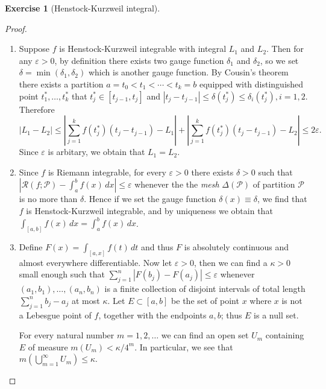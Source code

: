 \documentclass[a4paper]{article}
\newtheorem{ex}{Exercise}[subsection]
\begin{document}
\begin{ex}[Henstock-Kurzweil integral]\end{ex}\begin{proof}\ \begin{enumerate}[label = (\roman*)]
    \item Suppose $f$ is Henstock-Kurzweil integrable with integral $L_1$ and $L_2$. Then for any $\varepsilon > 0$,
    by definition there exists two gauge function $\delta_1$ and $\delta_2$, so we set $\delta = \min(\delta_1, \delta_2)$
    which is another gauge function. By Cousin's theorem there exists a partition $a = t_0 < t_1 < \cdots < t_k = b$
    equipped with distinguished point $t_1^*, \dots, t_k^*$ that $t_j^* \in [t_{j - 1}, t_j]$ and 
    $|t_j - t_{j - 1}| \leq \delta(t_j^*) \leq \delta_i(t_j^*), i = 1,2$. Therefore  $$
    |L_1 - L_2| \leq |\sum_{j = 1}^k f(t_j^*)(t_j - t_{j - 1}) - L_1| + |\sum_{j = 1}^k f(t_j^*)(t_j - t_{j - 1}) - L_2|
    \leq 2\varepsilon.
    $$Since $\varepsilon$ is arbitary, we obtain that $L_1 = L_2$.
    \item Since $f$ is Riemann integrable, for every $\varepsilon > 0$ there exists $\delta > 0$ such that 
    $|\mathcal{R}(f; \mathcal{P}) - \int_a^b f(x)\,dx| \leq \varepsilon$ whenever the the \emph{mesh} $\Delta(\mathcal{P})$ of partition 
    $\mathcal{P}$ is no more than $\delta$. Hence if we set the gauge function $\delta(x) \equiv \delta$, we find 
    that $f$ is Henstock-Kurzweil integrable, and by uniqueness we obtain that $\int_{[a, b]}f(x)\,dx = \int_a^b f(x)\,dx$.
    \item Define $F(x) = \int_{[a,x]}f(t)\,dt$ and thus $F$ is absolutely continuous and almost everywhere differentiable.
    Now let $\varepsilon > 0$, then we can find a $\kappa > 0$ small enough such that $\sum_{j = 1}^n |F(b_j) - F(a_j)| \leq \varepsilon$
    whenever $(a_1, b_1), \dots, (a_n, b_n)$ is a finite collection of disjoint intervals of total length 
    $\sum_{j = 1}^n b_j - a_j$ at most $\kappa$. Let $E \subset [a, b]$ be the set of point $x$ where $x$ is not a Lebesgue point of $f$, 
    together with the endpoints $a, b$; thus $E$ is a null set. 

    For every natural number $m = 1,2,\dots$ we can find an open set $U_m$ containing $E$ of measure $m(U_m) < \kappa/4^m$.
    In particular, we see that $m(\bigcup_{m = 1}^\infty U_m) \leq \kappa$.
    

\end{enumerate}
\end{proof}
\end{document}
